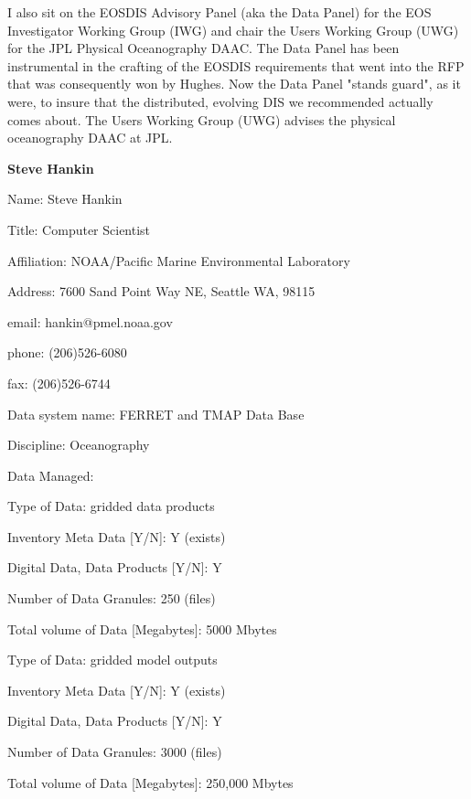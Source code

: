 	I also sit on the EOSDIS Advisory Panel (aka the Data Panel) for the 
EOS Investigator Working Group (IWG) and chair the Users Working Group 
(UWG) for the JPL Physical Oceanography DAAC. The Data Panel has been 
instrumental in the crafting of the EOSDIS requirements that went into 
the RFP that was consequently won by Hughes. Now the Data Panel "stands 
guard", as it were, to insure that the distributed, evolving DIS we 
recommended actually comes about. The Users Working Group (UWG) 
advises the physical oceanography DAAC at JPL.
\newpage

\begin{center}
\LARGE
{\bf  Steve Hankin}
\end{center}
\large
{}
\normalsize
\smallskip
\begin{description}
\item{Name:}  Steve Hankin
\item{Title:}  Computer Scientist
\item{Affiliation:}  NOAA/Pacific Marine Environmental Laboratory
\item{Address:}  7600 Sand Point Way NE, Seattle WA, 98115
\item{email:}  hankin@pmel.noaa.gov
\item{phone:}  (206)526-6080
\item{fax:}  (206)526-6744
\end{description}
\medskip
\large
{}
\normalsize
\medskip
\begin{description}

\item{Data system name:}  FERRET and TMAP Data Base
\item{Discipline:}  Oceanography
\item{Data Managed:}
	\begin{description}
	\item{Type of Data:}  gridded data products
	\item{Inventory Meta Data [Y/N]:}  Y (exists)
	\item{Digital Data, Data Products [Y/N]:}  Y
	\item{Number of Data Granules:}  250 (files)
	\item{Total volume of Data [Megabytes]:}  5000 Mbytes	
\medskip
	\item{Type of Data:}  gridded model outputs
	\item{Inventory Meta Data [Y/N]:}  Y (exists)
	\item{Digital Data, Data Products [Y/N]:}  Y
	\item{Number of Data Granules:}  3000 (files)
	\item{Total volume of Data [Megabytes]:}  250,000 Mbytes
	\end{description}
\end{description}

